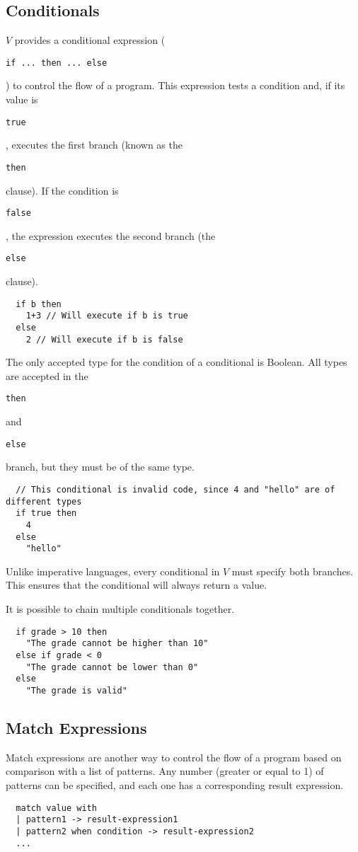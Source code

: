 \documentclass{article}
\def\code#1{\begin{footnotesize}\texttt{#1}\end{footnotesize}}
\begin{document}
\subsection{Conditionals}

$V$ provides a conditional expression (\code{if ... then ... else}) to control the flow of a program.
This expression tests a condition and, if its value is \code{true}, executes the first branch (known as the \code{then} clause).
If the condition is \code{false}, the expression executes the second branch (the \code{else} clause).

\begin{lstlisting}
  if b then
    1+3 // Will execute if b is true
  else
    2 // Will execute if b is false
\end{lstlisting}

The only accepted type for the condition of a conditional is Boolean.
All types are accepted in the \code{then} and \code{else} branch, but they must be of the same type.

\begin{lstlisting}
  // This conditional is invalid code, since 4 and "hello" are of different types
  if true then
    4
  else
    "hello"
\end{lstlisting}

Unlike imperative languages, every conditional in $V$ must specify both branches.
This ensures that the conditional will always return a value.

It is possible to chain multiple conditionals together.

\begin{lstlisting}
  if grade > 10 then
    "The grade cannot be higher than 10"
  else if grade < 0
    "The grade cannot be lower than 0"
  else
    "The grade is valid"
\end{lstlisting}

\subsection{Match Expressions}

Match expressions are another way to control the flow of a program based on comparison with a list of patterns.
Any number (greater or equal to 1) of patterns can be specified, and each one has a corresponding result expression.

\begin{lstlisting}
  match value with
  | pattern1 -> result-expression1
  | pattern2 when condition -> result-expression2
  ...
\end{lstlisting}
\end{document}
